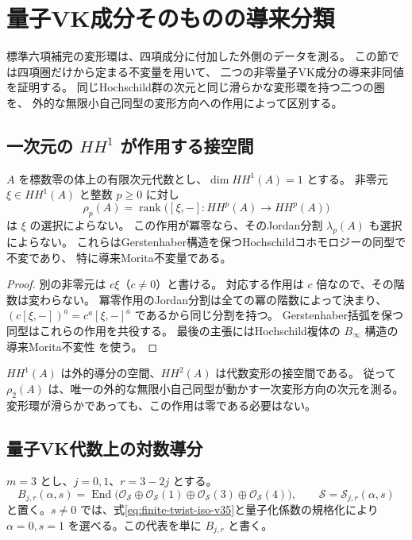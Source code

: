 \section{量子VK成分そのものの導来分類}
\label{sec:vk-intrinsic-classification-v36}

標準六項補完の変形環は、四項成分に付加した外側のデータを測る。
この節では四項圏だけから定まる不変量を用いて、
二つの非零量子VK成分の導来非同値を証明する。
同じHochschild群の次元と同じ滑らかな変形環を持つ二つの圏を、
外的な無限小自己同型の変形方向への作用によって区別する。

\subsection{一次元の $HH^1$ が作用する接空間}

\begin{lemma}[Hochschild作用の階数とJordan分割]
\label{lem:one-dimensional-HH1-action-v36}
$A$ を標数零の体上の有限次元代数とし、$\dim HH^1(A)=1$ とする。
非零元 $\xi\in HH^1(A)$ と整数 $p\ge0$ に対し
\[
 \rho_p(A)=\operatorname{rank}\bigl([\xi,-]:HH^p(A)\longrightarrow HH^p(A)\bigr)
\]
は $\xi$ の選択によらない。
この作用が冪零なら、そのJordan分割 $\lambda_p(A)$ も選択によらない。
これらはGerstenhaber構造を保つHochschildコホモロジーの同型で不変であり、
特に導来Morita不変量である。
\end{lemma}

\begin{proof}
別の非零元は $c\xi$（$c\ne0$）と書ける。
対応する作用は $c$ 倍なので、その階数は変わらない。
冪零作用のJordan分割は全ての冪の階数によって決まり、
$(c[\xi,-])^a=c^a[\xi,-]^a$ であるから同じ分割を持つ。
Gerstenhaber括弧を保つ同型はこれらの作用を共役する。
最後の主張にはHochschild複体の $B_\infty$ 構造の導来Morita不変性
\cite[Theorem~3.2 and Corollary]{KellerDerived2003}を使う。
\end{proof}

$HH^1(A)$ は外的導分の空間、$HH^2(A)$ は代数変形の接空間である。
従って $\rho_2(A)$ は、唯一の外的な無限小自己同型が動かす一次変形方向の次元を測る。
変形環が滑らかであっても、この作用は零である必要はない。

\subsection{量子VK代数上の対数導分}

$m=3$ とし、$j=0,1$、$r=3-2j$ とする。
\[
 B_{j,r}(\alpha,s)
 =\operatorname{End}\bigl(
 \mathcal O_{\mathcal S}\oplus\mathcal O_{\mathcal S}(1)
 \oplus\mathcal O_{\mathcal S}(3)\oplus\mathcal O_{\mathcal S}(4)\bigr),
 \qquad \mathcal S=\mathcal S_{j,r}(\alpha,s)
\]
と置く。$s\ne0$ では、式\eqref{eq:finite-twist-iso-v35}と量子化係数の規格化により
$\alpha=0,s=1$ を選べる。この代表を単に $B_{j,r}$ と書く。

